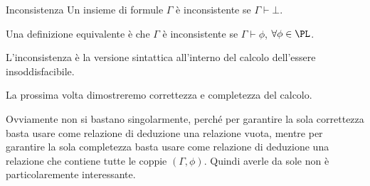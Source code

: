 \begin{definition}{Inconsistenza}
  Un insieme di formule \(\Gamma\) è inconsistente se \(\Gamma \vdash \bot\).

  Una definizione equivalente è che \(\Gamma\) è inconsistente se \(\Gamma \vdash \phi\), \(\forall \phi \in \PL\).
\end{definition}

L'inconsistenza è la versione sintattica all'interno del calcolo dell'essere insoddisfacibile.

La prossima volta dimostreremo correttezza e completezza del calcolo.

Ovviamente non si bastano singolarmente, perché per garantire la sola correttezza basta usare come relazione di deduzione una relazione vuota, mentre per garantire la sola completezza basta usare come relazione di deduzione una relazione che contiene tutte le coppie \((\Gamma, \phi)\). Quindi averle da sole non è particolaremente interessante.
